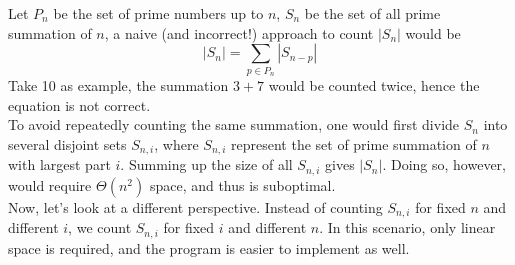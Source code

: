 \documentclass[12pt]{article}
\begin{document}
Let $P_n$ be the set of prime numbers up to $n$, $S_n$ be the set of all prime summation of $n$, a naive (and incorrect!) approach to count $|S_n|$ would be
$$|S_n| = \sum_{p\in P_n} |S_{n-p}|$$
Take 10 as example, the summation $3+7$ would be counted twice, hence the equation is not correct.\\
To avoid repeatedly counting the same summation, one would first divide $S_n$ into several disjoint sets $S_{n,i}$, where $S_{n,i}$ represent the set of prime summation of $n$ with largest part $i$. Summing up the size of all $S_{n,i}$ gives $|S_n|$. Doing so, however, would require $\Theta(n^2)$ space, and thus is suboptimal.\\
Now, let's look at a different perspective. Instead of counting $S_{n,i}$ for fixed $n$ and different $i$, we count $S_{n,i}$ for fixed $i$ and different $n$. In this scenario, only linear space is required, and the program is easier to implement as well.
\end{document}
